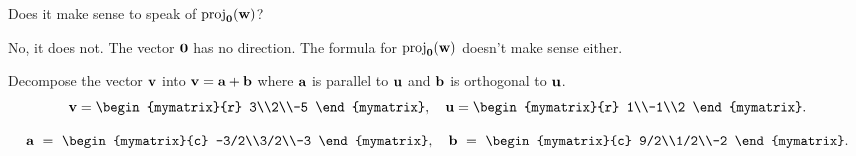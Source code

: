 \begin{ex}
  Does it make sense to speak of $\proj_{\vect{0}}(\vect{w})$?
  \begin{sol}
    No, it does not. The vector $\vect{0}$ has no direction. The
    formula for $\proj_{\vect{0}}(\vect{w})$ doesn't make sense
    either.
  \end{sol}
\end{ex}

\begin{ex}
  Decompose the vector $\vect{v}$ into $\vect{v}=\vect{a}+\vect{b}$
  where $\vect{a}$ is parallel to $\vect{u}$ and $\vect{b}$ is
  orthogonal to $\vect{u}$.
  \begin{equation*}
    \vect{v} = \begin{mymatrix}{r} 3\\2\\-5 \end{mymatrix},\quad
    \vect{u} = \begin{mymatrix}{r} 1\\-1\\2 \end{mymatrix}.
  \end{equation*}

  \begin{sol}
    \begin{equation*}
      \vect{a} ~=~ \begin{mymatrix}{c} -3/2\\3/2\\-3 \end{mymatrix},\quad
      \vect{b} ~=~ \begin{mymatrix}{c} 9/2\\1/2\\-2 \end{mymatrix}.
    \end{equation*}
  \end{sol}
\end{ex}


